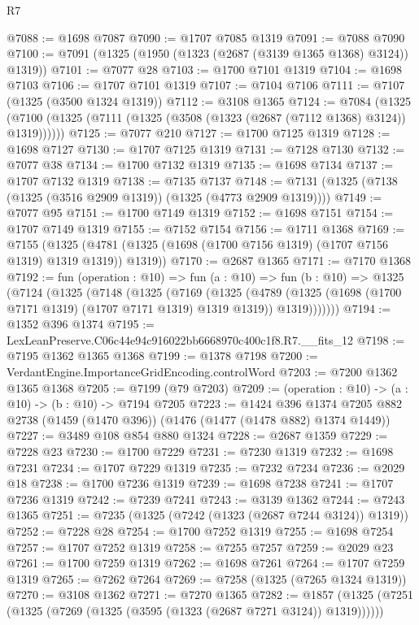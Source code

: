 \begin{lexlean}{R7}
\begin{coremodule}
@7088 := @1698 @7087
@7090 := @1707 @7085 @1319
@7091 := @7088 @7090
@7100 := @7091 (@1325 (@1950 (@1323 (@2687 (@3139 @1365 @1368) @3124)) @1319))
@7101 := @7077 @28
@7103 := @1700 @7101 @1319
@7104 := @1698 @7103
@7106 := @1707 @7101 @1319
@7107 := @7104 @7106
@7111 := @7107 (@1325 (@3500 @1324 @1319))
@7112 := @3108 @1365
@7124 := @7084
    (@1325 (@7100 (@1325 (@7111 (@1325 (@3508 (@1323 (@2687 (@7112 @1368) @3124)) @1319))))))
@7125 := @7077 @210
@7127 := @1700 @7125 @1319
@7128 := @1698 @7127
@7130 := @1707 @7125 @1319
@7131 := @7128 @7130
@7132 := @7077 @38
@7134 := @1700 @7132 @1319
@7135 := @1698 @7134
@7137 := @1707 @7132 @1319
@7138 := @7135 @7137
@7148 := @7131 (@1325 (@7138 (@1325 (@3516 @2909 @1319)) (@1325 (@4773 @2909 @1319))))
@7149 := @7077 @95
@7151 := @1700 @7149 @1319
@7152 := @1698 @7151
@7154 := @1707 @7149 @1319
@7155 := @7152 @7154
@7156 := @1711 @1368
@7169 := @7155
    (@1325 (@4781 (@1325 (@1698 (@1700 @7156 @1319) (@1707 @7156 @1319) @1319 @1319)) @1319))
@7170 := @2687 @1365
@7171 := @7170 @1368
@7192 := fun (operation : @10) =>
  fun (a : @10) =>
  fun (b : @10) =>
  @1325
    (@7124
      (@1325
        (@7148
          (@1325
            (@7169
              (@1325
                (@4789
                  (@1325 (@1698 (@1700 @7171 @1319) (@1707 @7171 @1319) @1319 @1319))
                  @1319)))))))
@7194 := @1352 @396 @1374
@7195 := LexLeanPreserve.C06c44e94c916022bb6668970c400c1f8.R7.__fits_12
@7198 := @7195 @1362 @1365 @1368
@7199 := @1378 @7198
@7200 := VerdantEngine.ImportanceGridEncoding.controlWord
@7203 := @7200 @1362 @1365 @1368
@7205 := @7199 (@79 @7203)
@7209 := (operation : @10) -> (a : @10) -> (b : @10) -> @7194 @7205
@7223 := @1424
    @396
    @1374
    @7205
    @882
    @2738
    (@1459 (@1470 @396))
    (@1476 (@1477 (@1478 @882) @1374 @1449))
@7227 := @3489 @108 @854 @880 @1324
@7228 := @2687 @1359
@7229 := @7228 @23
@7230 := @1700 @7229
@7231 := @7230 @1319
@7232 := @1698 @7231
@7234 := @1707 @7229 @1319
@7235 := @7232 @7234
@7236 := @2029 @18
@7238 := @1700 @7236 @1319
@7239 := @1698 @7238
@7241 := @1707 @7236 @1319
@7242 := @7239 @7241
@7243 := @3139 @1362
@7244 := @7243 @1365
@7251 := @7235 (@1325 (@7242 (@1323 (@2687 @7244 @3124)) @1319))
@7252 := @7228 @28
@7254 := @1700 @7252 @1319
@7255 := @1698 @7254
@7257 := @1707 @7252 @1319
@7258 := @7255 @7257
@7259 := @2029 @23
@7261 := @1700 @7259 @1319
@7262 := @1698 @7261
@7264 := @1707 @7259 @1319
@7265 := @7262 @7264
@7269 := @7258 (@1325 (@7265 @1324 @1319))
@7270 := @3108 @1362
@7271 := @7270 @1365
@7282 := @1857 (@1325 (@7251 (@1325 (@7269 (@1325 (@3595 (@1323 (@2687 @7271 @3124)) @1319))))))

\end{coremodule}
\end{lexlean}
